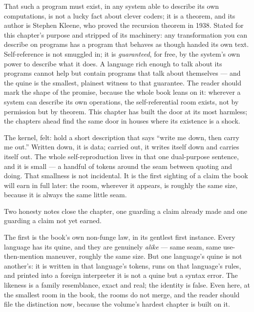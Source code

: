 That such a program must exist, in any system able to describe its own
computations, is not a lucky fact about clever coders; it is a theorem,
and its author is Stephen Kleene, who proved the recursion theorem in
1938. Stated for this chapter's purpose and stripped of its machinery:
any transformation you can describe on programs has a program that
behaves as though handed its own text. Self-reference is not smuggled in;
it is \emph{guaranteed}, for free, by the system's own power to describe
what it does. A language rich enough to talk about its programs cannot
help but contain programs that talk about themselves --- and the quine is
the smallest, plainest witness to that guarantee. The reader should mark
the shape of the promise, because the whole book leans on it: wherever a
system can describe its own operations, the self-referential room exists,
not by permission but by theorem. This chapter has built the door at its
most harmless; the chapters ahead find the same door in houses where its
existence is a shock.

\begin{intuition}
The kernel, felt: hold a short description that says ``write me down, then
carry me out.'' Written down, it is data; carried out, it writes itself
down and carries itself out. The whole self-reproduction lives in that
one dual-purpose sentence, and it is small --- a handful of tokens around
the seam between quoting and doing. That smallness is not incidental. It
is the first sighting of a claim the book will earn in full later: the
room, wherever it appears, is roughly the same size, because it is always
the same little seam.
\end{intuition}

Two honesty notes close the chapter, one guarding a claim already made
and one guarding a claim not yet earned.

The first is the book's own non-funge law, in its gentlest first
instance. Every language has its quine, and they are genuinely
\emph{alike} --- same seam, same use-then-mention maneuver, roughly the
same size. But one language's quine is not another's: it is written in
that language's tokens, runs on that language's rules, and printed into a
foreign interpreter it is not a quine but a syntax error. The likeness is
a family resemblance, exact and real; the identity is false. Even here,
at the smallest room in the book, the rooms do not merge, and the reader
should file the distinction now, because the volume's hardest chapter is
built on it.

